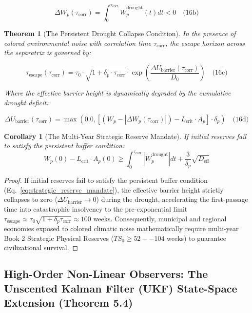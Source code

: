 \documentclass[preprint,12pt,authoryear]{elsarticle}
\newtheorem{theorem}{Theorem}
\newtheorem{corollary}{Corollary}
\theoremstyle{definition}
\begin{document}
$$\Delta W_p(\tau_{\text{corr}}) = \int_0^{\tau_{\text{corr}}} \dot{W}_p^{\text{drought}}(t) dt < 0 \quad \text{(16b)}$$

\begin{theorem}[The Persistent Drought Collapse Condition]
In the presence of colored environmental noise with correlation time $\tau_{\text{corr}}$, the escape horizon across the separatrix is governed by:

$$\tau_{\text{escape}}(\tau_{\text{corr}}) = \tau_0 \cdot \sqrt{1 + \delta_p \cdot \tau_{\text{corr}}} \cdot \exp\left( \frac{\Delta U_{\text{barrier}}(\tau_{\text{corr}})}{D_0} \right) \quad \text{(16c)}$$

Where the effective barrier height is dynamically degraded by the cumulative drought deficit:

$$\Delta U_{\text{barrier}}(\tau_{\text{corr}}) = \max\left(0.0, \left[ (W_p - |\Delta W_p(\tau_{\text{corr}})|) - L_{\text{crit}} \cdot A_p \right] \cdot \delta_p \right) \quad \text{(16d)}$$

\end{theorem}

\begin{corollary}[The Multi-Year Strategic Reserve Mandate]
If initial reserves fail to satisfy the persistent buffer condition:
\begin{equation}
W_p(0) - L_{\text{crit}} \cdot A_p(0) \ge \int_0^{\tau_{\text{corr}}} |\dot{W}_p^{\text{drought}}| dt + \frac{3}{\delta_p} \sqrt{D_{\text{eff}}} \label{eq:strategic_reserve_mandate}
\end{equation}
\end{corollary}

\begin{proof}
If initial reserves fail to satisfy the persistent buffer condition (Eq.~\ref{eq:strategic_reserve_mandate}), the effective barrier height strictly collapses to zero ($\Delta U_{\text{barrier}} \to 0$) during the drought, accelerating the first-passage time into catastrophic insolvency to the pre-exponential limit $\tau_{\text{escape}} \approx \tau_0 \sqrt{1 + \delta_p \tau_{\text{corr}}} \approx 100$ weeks. Consequently, municipal and regional economies exposed to colored climatic noise mathematically require multi-year Book 2 Strategic Physical Reserves ($TS_0 \ge 52--104$ weeks) to guarantee civilizational survival. \end{proof}

\subsection{High-Order Non-Linear Observers: The Unscented Kalman Filter (UKF) State-Space Extension (Theorem 5.4)}
\end{document}
